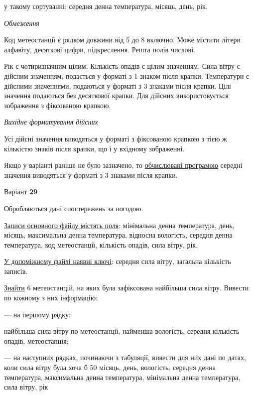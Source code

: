 \documentclass[11pt, ukrainian]{article}
\begin{document}
{\noindent}у такому сортуванні: середня денна температура, місяць, день, рік.


\bigskip\textit{Обмеження}

Код метеостанції є рядком довжини від 5 до 8 включно.
Може містити літери алфавіту, десяткові цифри, підкреслення. Решта полів числові.

Рік є чотиризначним цілим.
Кількість опадів є цілим значенням.
Сила вітру є дійсним значенням, подається у форматі з 1 знаком після крапки.
Температури є дійсними значеннями, подаються у форматі з 3 знаками після крапки.
Цілі значення подаються без десяткової крапки.
Для дійсних використовується зображення з фіксованою крапкою.

\textit{Вихідне форматування дійсних}

Усі дійсні значення виводяться у форматі з фіксованою крапкою з тією ж кількістю знаків після крапки, що і у вхідному зображенні.

Якщо у варіанті раніше не було зазначено, то \underline{обчислювані програмою} середні значення виводяться у форматі з 3 знаками після крапки.


\par
\newpage
{\center Варіант  \No \textbf { 29 }\par}
\bigskip
Обробляються дані спостережень за погодою. 

\underline{Записи основного файлу містять поля}: мінімальна денна температура, день, місяць, максимальна денна температура, відносна вологість, середня денна температура, код метеостанції, кількість опадів, сила вітру, рік.

\underline{У допоміжному файлі наявні ключі}: середня сила вітру, загальна кількість записів.

\underline{Знайти} 6 метеостанцій, на яких була зафіксована найбільша сила вітру. Вивести по кожному з них інформацію:\par
{\noindent}--- на першому рядку:\par
найбільша сила вітру по метеостанції, найменша вологість, середня кількість опадів, метеостанція;

{\noindent}--- на наступних рядках, починаючи з табуляції, вивести для них дані по датах, коли сила вітру була хоча б 50%
місяць, день, вологість, середня денна температура, максимальна денна температура, мінімальна денна температура, сила вітру, рік
\end{document}
